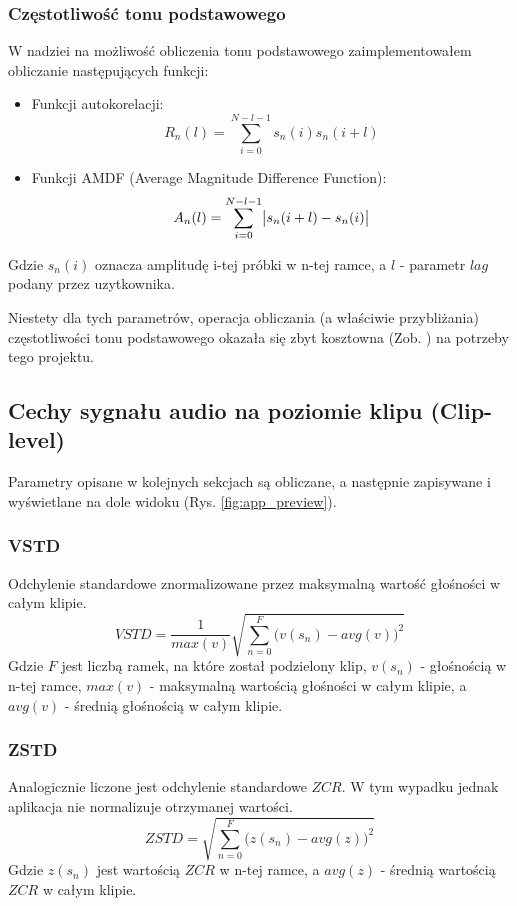 \documentclass[12pt,a4paper]{article}
\begin{document}
\subsubsection{Częstotliwość tonu podstawowego\label{sec:f0}}
W nadziei na możliwość obliczenia tonu podstawowego zaimplementowałem obliczanie następujących funkcji:
\begin{itemize}
\item
    Funkcji autokorelacji:
    \begin{equation}
        R_n(l)=\sum_{i=0}^{N-l-1}s_n(i)s_n(i+l)
    \end{equation}
\item
    Funkcji AMDF (Average Magnitude Difference Function):
    \begin{equation}
        A_n(l)=\sum_{i=0}^{N-l-1}\abs{s_n(i+l)-s_n(i)}
    \end{equation}
\end{itemize}
Gdzie $s_n(i)$ oznacza amplitudę i-tej próbki w n-tej ramce, a $l$ - parametr $lag$ podany przez uzytkownika.

Niestety dla tych parametrów, operacja obliczania (a właściwie przybliżania) częstotliwości tonu podstawowego okazała się zbyt kosztowna (Zob. \cite{leszczyna}) na potrzeby tego projektu.

\subsection{Cechy sygnału audio na poziomie klipu (Clip-level)\label{sec:cliplevel}}
Parametry opisane w kolejnych sekcjach są obliczane, a następnie zapisywane i wyświetlane na dole widoku (Rys. \ref{fig:app_preview}).

\subsubsection{VSTD\label{sec:vstd}}
Odchylenie standardowe znormalizowane przez maksymalną wartość głośności w całym klipie.
\begin{equation}
    VSTD=\frac{1}{max(v)}\sqrt{
        \sum_{n=0}^{F}\big(
            v(s_n) - avg(v)
        \big)^2
    }
\end{equation}
Gdzie $F$ jest liczbą ramek, na które został podzielony klip, $v(s_n)$ - głośnością w n-tej ramce, $max(v)$ - maksymalną wartością głośności w całym klipie, a $avg(v)$ - średnią głośnością w całym klipie.

\subsubsection{ZSTD\label{sec:zstd}}
Analogicznie liczone jest odchylenie standardowe $ZCR$. W tym wypadku jednak aplikacja nie normalizuje otrzymanej wartości.
\begin{equation}
    ZSTD=\sqrt{
        \sum_{n=0}^{F}\big(
            z(s_n) - avg(z)
        \big)^2
    }
\end{equation}
Gdzie $z(s_n)$ jest wartością $ZCR$ w n-tej ramce, a $avg(z)$ - średnią wartością $ZCR$ w całym klipie.
\end{document}
